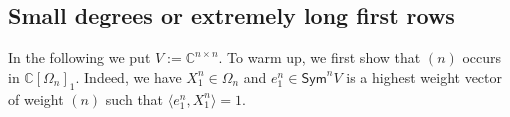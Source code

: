 \documentclass[11pt]{amsart}
\def\C{\mathbb{C}}
\def\Sym{\mathsf{Sym}}
\newcommand{\Det}{\Omega}
\def\la{\lambda}
\newcommand{\IC}{\ensuremath{\mathbb{C}}}
\numberwithin{equation}{section}
\newtheorem{proposition}[theorem]{Proposition}
\begin{document}
\subsection{Small degrees or extremely long first rows}\label{sec:SmDeg}

In the following we put $V:=\C^{n\times n}$. 
To warm up, we first show that $(n)$ occurs in $\IC[\Det_n]_1$.
Indeed, we have $X_{1}^n \in\Det_n$ and $e_1^n \in \Sym^n V$ is 
a highest weight vector of weight $(n)$ such that 
$\langle e_1^n, X_1^n \rangle = 1$.


\end{document}
